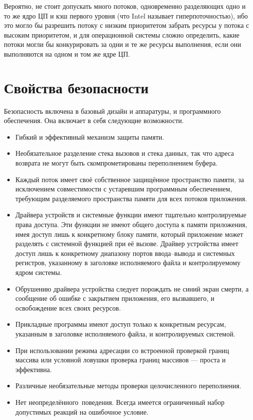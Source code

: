 \documentclass[forwardcom.tex]{subfiles}
\begin{document}
Вероятно, не стоит допускать много потоков, одновременно разделяющих одно и то же ядро ЦП и кэш первого уровня (что Intel называет гиперпоточностью), ибо это могло бы разрешить потоку с низким приоритетом забрать ресурсы у потока с высоким приоритетом, и для операционной системы сложно определить, какие потоки могли бы конкурировать за одни и те же ресурсы выполнения, если они выполняются на одном и том же ядре ЦП.

\section{Свойства безопасности} \label{securityFeatures}
Безопасность включена в базовый дизайн и аппаратуры, и программного обеспечения. Она включает в себя следующие возможности.
\begin{itemize}
\item Гибкий и эффективный механизм защиты памяти.

\item Необязательное разделение стека вызовов и стека данных, так что адреса возврата не могут быть скомпрометированы переполнением буфера.

\item Каждый поток имеет своё собственное защищённое пространство памяти, за исключением совместимости с устаревшим программным обеспечением, требующим разделяемого пространства памяти для всех потоков приложения.

\item Драйвера устройств и системные функции имеют тщательно контролируемые права доступа. Эти функции не имеют общего доступа к памяти приложения, имея доступ лишь к конкретному блоку памяти, который приложение может разделять с системной функцией при её вызове. Драйвер устройства имеет доступ лишь к конкретному диапазону портов ввода--вывода и системных регистров, указанному в заголовке исполняемого файла и контролируемому ядром системы.

\item Обрушению драйвера устройства следует порождать не \glqq синий экран смерти\grqq, а сообщение об ошибке с закрытием приложения, его вызвавшего, и освобождение всех своих ресурсов.

\item Прикладные программы имеют доступ только к конкретным ресурсам, указанным в заголовке исполняемого файла, и контролируемых системой.

\item При использовании режима адресации со встроенной проверкой границ массива или условной ловушки проверка границ массивов --- проста и эффективна.

\item Различные необязательные методы проверки целочисленного переполнения.

\item Нет \glqq неопределённого\grqq\ поведения. Всегда имеется ограниченный набор допустимых реакций на ошибочное условие.
\end{itemize}
\end{document}
